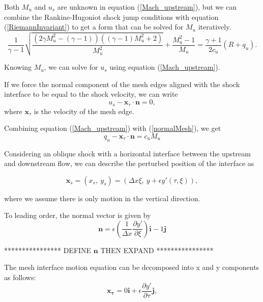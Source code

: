 \documentclass[10pt]{article}
\begin{document}
	Both $M_u$ and $u_s$ are unknown in equation (\ref{Mach_upstream}), but we can combine the Rankine-Hugoniot shock jump conditions with equation (\ref{RiemannInvariant}) to get a form that can be solved for $M_u$ iteratively.
	\begin{equation} \label{Mach_upstream2}
		\frac{1}{\gamma-1} \sqrt{ \frac{(2\gamma M_u^2-(\gamma-1))((\gamma-1)M_u^2+2)}{M_u^2}}+\frac{M_u^2-1}{M_u} = \frac{\gamma+1}{2c_u}(R+q_u).
	\end{equation}

	Knowing $M_u$, we can solve for $u_s$ using equation (\ref{Mach_upstream}).
	
	 If we force the normal component of the mesh edges aligned with the shock interface to be equal to the shock velocity, we can write
	 \begin{equation} \label{normalMesh}
	 	u_s - \mathbf{x}_{\tau} \cdot \mathbf{n} = 0,
	 \end{equation}
 	where $\mathbf{x}_{\tau}$ is the velocity of the mesh edge.
 	
 	Combining equation (\ref{Mach_upstream}) with (\ref{normalMesh}), we get
 	\begin{equation} \label{Mach_normal_upstream} 
 		q_u - \mathbf{x}_{\tau} \cdot \mathbf{n} = c_u M_u
 	\end{equation}
	
	Considering an oblique shock with a horizontal interface between the upstream and downstream flow, we can describe the perturbed position of the interface as
	
	\begin{equation}
		\mathbf{x}_s = (x_s, \: y_s) = (\Delta x \xi, \: y + \epsilon y'(\tau,\xi)),
	\end{equation}

	where we assume there is only motion in the vertical direction.
	
	To leading order, the normal vector is given by
	\begin{equation}
		\mathbf{n} = \epsilon \left(\frac{1}{\Delta x} \frac{\partial y'}{\partial \xi} \right) \mathbf{i} - 1\mathbf{j}
	\end{equation}
	
	**************** DEFINE $\mathbf{n}$ THEN EXPAND ****************
	
	The mesh interface motion equation can be decomposed into x and y components as follows:
	\begin{equation}
		\mathbf{x_{\tau}} = 0 \mathbf{i} + \epsilon \frac{\partial y'}{\partial \tau} \mathbf{j},
	\end{equation}
\end{document}
